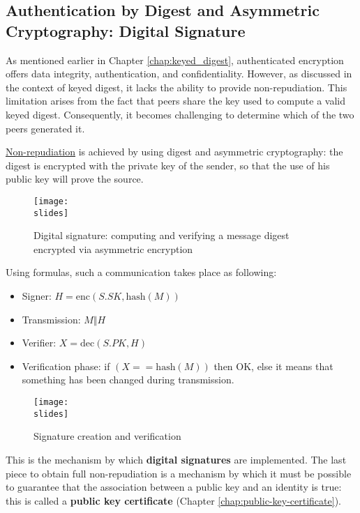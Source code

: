 \subsection{Authentication by Digest and Asymmetric Cryptography: Digital Signature}

As mentioned earlier in Chapter \ref{chap:keyed_digest}, authenticated encryption offers data integrity, authentication, and confidentiality. However, as discussed in the context of keyed digest, it lacks the ability to provide non-repudiation. This limitation arises from the fact that peers share the key used to compute a valid keyed digest. Consequently, it becomes challenging to determine which of the two peers generated it.

\underline{Non-repudiation} is achieved by using digest and asymmetric cryptography: the digest is encrypted with the private key of the sender, so that the use of his public key will prove the source.

\begin{figure}[h]
    \centering
    \texttt{[image: \\slides]}
    \caption{Digital signature: computing and verifying a
    message digest encrypted via asymmetric encryption}
\end{figure}

Using formulas, such a communication takes place as following:
\begin{itemize}
    \item Signer: $H = \text{enc}(S.SK, \text{hash}(M))$
    \item Transmission: $M \Vert H$
    \item Verifier: $X = \text{dec}(S.PK, H)$
    \item Verification phase: if $(X == \text{hash}(M))$ then OK, else it means that something has been changed during transmission.
\end{itemize}


\begin{figure}[h]
    \centering
    \texttt{[image: \\slides]}
    \caption{Signature creation and verification}
\end{figure}

This is the mechanism by which \textbf{digital signatures} are implemented. 
The last piece to obtain full non-repudiation is a mechanism by which it must be possible to guarantee that the association between a public key and an identity is true: 
this is called a \textbf{public key certificate} (Chapter \ref{chap:public-key-certificate}).

